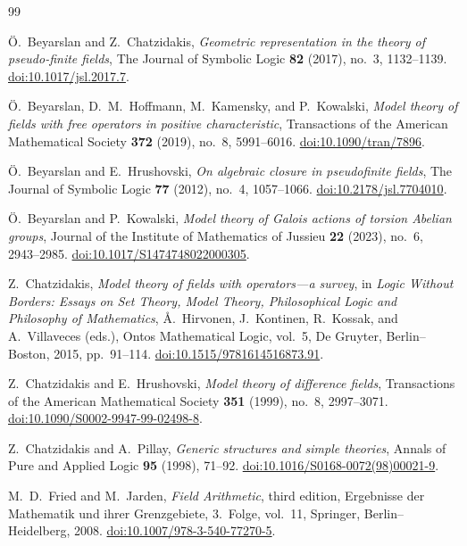 \documentclass[11pt,a4paper]{amsart}
\theoremstyle{definition}
\begin{document}
\begin{thebibliography}{99}
\small
\raggedright

\"O.~Beyarslan and Z.~Chatzidakis,
\emph{Geometric representation in the theory of pseudo-finite fields},
The Journal of Symbolic Logic
\textbf{82} (2017), no.~3, 1132--1139.
\href{https://doi.org/10.1017/jsl.2017.7}
{doi:10.1017/jsl.2017.7}.

\"O.~Beyarslan, D.~M.~Hoffmann, M.~Kamensky, and P.~Kowalski,
\emph{Model theory of fields with free operators in positive characteristic},
Transactions of the American Mathematical Society
\textbf{372} (2019), no.~8, 5991--6016.
\href{https://doi.org/10.1090/tran/7896}
{doi:10.1090/tran/7896}.

\"O.~Beyarslan and E.~Hrushovski,
\emph{On algebraic closure in pseudofinite fields},
The Journal of Symbolic Logic
\textbf{77} (2012), no.~4, 1057--1066.
\href{https://doi.org/10.2178/jsl.7704010}
{doi:10.2178/jsl.7704010}.


\"O.~Beyarslan and P.~Kowalski,
\emph{Model theory of Galois actions of torsion Abelian groups},
Journal of the Institute of Mathematics of Jussieu
\textbf{22} (2023), no.~6, 2943--2985.
\href{https://doi.org/10.1017/S1474748022000305}
{doi:10.1017/S1474748022000305}.


Z.~Chatzidakis,
\emph{Model theory of fields with operators---a survey},
in \emph{Logic Without Borders: Essays on Set Theory, Model Theory,
Philosophical Logic and Philosophy of Mathematics},
\AA.~Hirvonen, J.~Kontinen, R.~Kossak, and A.~Villaveces (eds.),
Ontos Mathematical Logic, vol.~5,
De Gruyter, Berlin--Boston, 2015, pp.~91--114.
\href{https://doi.org/10.1515/9781614516873.91}
{doi:10.1515/9781614516873.91}.

Z.~Chatzidakis and E.~Hrushovski,
\emph{Model theory of difference fields},
Transactions of the American Mathematical Society
\textbf{351} (1999), no.~8, 2997--3071.
\href{https://doi.org/10.1090/S0002-9947-99-02498-8}
{doi:10.1090/S0002-9947-99-02498-8}.

Z.~Chatzidakis and A.~Pillay,
\emph{Generic structures and simple theories},
Annals of Pure and Applied Logic
\textbf{95} (1998), 71--92.
\href{https://doi.org/10.1016/S0168-0072(98)00021-9}
{doi:10.1016/S0168-0072(98)00021-9}.

M.~D.~Fried and M.~Jarden,
\emph{Field Arithmetic},
third edition,
Ergebnisse der Mathematik und ihrer Grenzgebiete, 3.~Folge,
vol.~11, Springer, Berlin--Heidelberg, 2008.
\href{https://doi.org/10.1007/978-3-540-77270-5}
{doi:10.1007/978-3-540-77270-5}.


\end{thebibliography}
\end{document}
